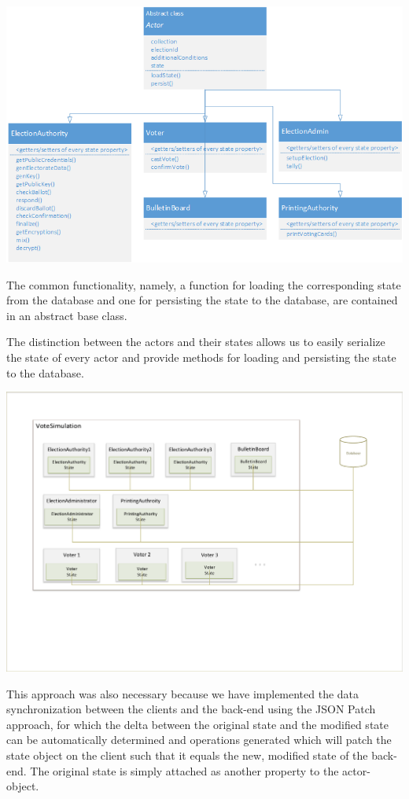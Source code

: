 \begin{center}
\includegraphics[scale=0.62]{assets/actorClasses.png}
\label{Actor classes}%
\end{center}
The common functionality, namely, a function for loading the corresponding state from the database and one for persisting the state to the database, are contained in an abstract base class.

The distinction between the actors and their states allows us to easily serialize the state of every actor and provide methods for loading and persisting the state to the database.

\begin{center}
\includegraphics[scale=0.62]{assets/votesim.pdf}
\label{State classes}%
\end{center}
This approach was also necessary because we have implemented the data synchronization between the clients and the back-end using the JSON Patch approach, for which the delta between the original state and the modified state can be automatically determined and operations generated which will patch the state object on the client such that it equals the new, modified state of the back-end. The original state is simply attached as another property to the actor-object. 

